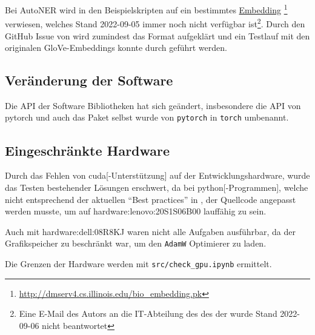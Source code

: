 Bei \gls{AutoNER}
wird in den Beispielskripten auf ein bestimmtes
\href{http://dmserv4.cs.illinois.edu/bio_embedding.pk}{Embedding} \footnote{\url{http://dmserv4.cs.illinois.edu/bio_embedding.pk}}
verwiesen,
welches Stand 2022-09-05 immer noch nicht verfügbar ist\footnote{
	Eine E-Mail des Autors an die IT-Abteilung des 
	des 
	der 
	wurde Stand 2022-09-06
	nicht beantwortet}.
Durch den GitHub Issue \autocite{shangjingbo1226:AutoNER:issues:44} von
\citeauthor{shangjingbo1226:AutoNER:issues:44}
wird zumindest das Format aufgeklärt
und ein Testlauf mit den originalen \gls{GloVe}-Embeddings konnte durch geführt werden. \autocite{pennington2014glove}


\subsection{Veränderung der Software}

Die API der Software Bibliotheken hat sich geändert,
insbesondere die API von \gls{pytorch}
und auch das Paket
selbst wurde von \texttt{pytorch} in
\texttt{torch} umbenannt.

\subsection{Eingeschränkte Hardware}
Durch das Fehlen von \gls{cuda}[-Unterstützung]
auf der Entwicklungshardware,
wurde das Testen bestehender Lösungen erschwert,
da bei \gls{python}[-Programmen],
welche nicht entsprechend der aktuellen \enquote{Best practices}
in \autocite[Device-agnostic code]{pytorch:docs:1.12:notes:cuda},
der Quellcode angepasst werden musste,
um auf \gls{hardware:lenovo:20S1S06B00} lauffähig zu sein.

Auch mit \gls{hardware:dell:08R8KJ} waren nicht alle Aufgaben ausführbar,
da der Grafikspeicher zu beschränkt war,
um den \texttt{AdamW} Optimierer zu laden.



Die Grenzen der Hardware werden mit \texttt{src/check_gpu.ipynb}
ermittelt. \autocite{huggingface:docs:Transformers:perf_train_gpu_one}


